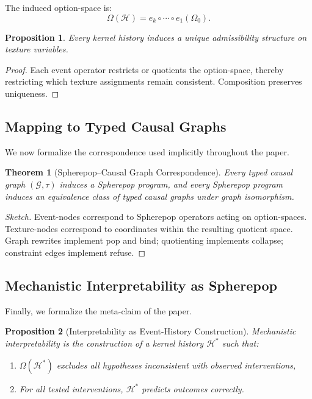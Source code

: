 \documentclass[11pt]{article}
\newtheorem{proposition}{Proposition}
\newtheorem{theorem}{Theorem}
\theoremstyle{remark}
\newcommand{\Hist}{\mathcal{H}}
\newcommand{\Graph}{\mathcal{G}}
\begin{document}
The induced option-space is:
\[
\Omega(\Hist) = e_k \circ \cdots \circ e_1 (\Omega_0).
\]

\begin{proposition}
Every kernel history induces a unique admissibility structure on
texture variables.
\end{proposition}

\begin{proof}
Each event operator restricts or quotients the option-space, thereby
restricting which texture assignments remain consistent. Composition
preserves uniqueness.
\end{proof}

\subsection{Mapping to Typed Causal Graphs}

We now formalize the correspondence used implicitly throughout the
paper.

\begin{theorem}[Spherepop–Causal Graph Correspondence]
Every typed causal graph $(\Graph, \tau)$ induces a Spherepop program,
and every Spherepop program induces an equivalence class of typed
causal graphs under graph isomorphism.
\end{theorem}

\begin{proof}[Sketch]
Event-nodes correspond to Spherepop operators acting on option-spaces.
Texture-nodes correspond to coordinates within the resulting quotient
space. Graph rewrites implement pop and bind; quotienting implements
collapse; constraint edges implement refuse.
\end{proof}

\subsection{Mechanistic Interpretability as Spherepop}

Finally, we formalize the meta-claim of the paper.

\begin{proposition}[Interpretability as Event-History Construction]
Mechanistic interpretability is the construction of a kernel history
$\Hist^\ast$ such that:
\begin{enumerate}
\item $\Omega(\Hist^\ast)$ excludes all hypotheses inconsistent with
observed interventions,
\item For all tested interventions, $\Hist^\ast$ predicts outcomes
correctly.
\end{enumerate}
\end{proposition}
\end{document}
